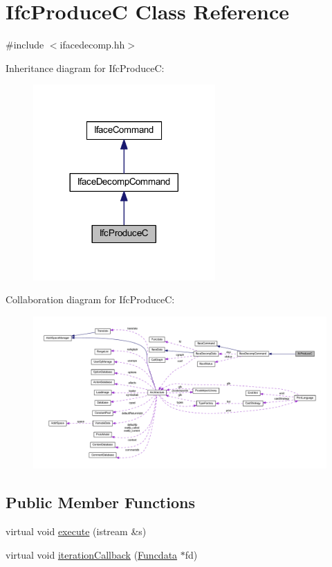 \hypertarget{class_ifc_produce_c}{}\section{Ifc\+ProduceC Class Reference}
\label{class_ifc_produce_c}


{\ttfamily \#include $<$ifacedecomp.\+hh$>$}



Inheritance diagram for Ifc\+ProduceC\+:
\nopagebreak
\begin{figure}[H]
\begin{center}
\leavevmode
\includegraphics[width=197pt]{class_ifc_produce_c__inherit__graph}
\end{center}
\end{figure}


Collaboration diagram for Ifc\+ProduceC\+:
\nopagebreak
\begin{figure}[H]
\begin{center}
\leavevmode
\includegraphics[width=350pt]{class_ifc_produce_c__coll__graph}
\end{center}
\end{figure}
\subsection*{Public Member Functions}
\begin{DoxyCompactItemize}
\item 
virtual void \mbox{\hyperlink{class_ifc_produce_c_a45af16c6237ea8ff52caa3a7f655cb16}{execute}} (istream \&s)
\item 
virtual void \mbox{\hyperlink{class_ifc_produce_c_ae7aa419deb8e0f730e574b40ac69b2d7}{iteration\+Callback}} (\mbox{\hyperlink{class_funcdata}{Funcdata}} $\ast$fd)
\end{DoxyCompactItemize}
